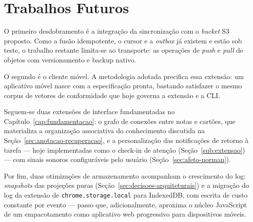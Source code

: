 \documentclass[12pt, %
openright, 
oneside,
a4paper,
english,   %
brazil]{facom-ufu-abntex2}
\begin{document}
\section{Trabalhos Futuros}

O primeiro desdobramento é a integração da sincronização com o
\textit{bucket} S3 proposto. Como a fusão idempotente, o cursor e a
\textit{outbox} já existem e estão sob teste, o trabalho restante
limita-se ao transporte: as operações de \textit{push} e \textit{pull}
de objetos com versionamento e backup nativo.

O segundo é o cliente móvel. A metodologia adotada precifica essa extensão:
um aplicativo móvel nasce com a especificação pronta, bastando satisfazer o
mesmo corpus de vetores de conformidade que hoje governa a extensão e a CLI.

Seguem-se duas extensões de interface fundamentadas no
Capítulo~\ref{cap:fundamentacao}: o grafo de conexões entre notas e cartões,
que materializa a organização associativa do conhecimento discutida na
Seção~\ref{sec:anotacao-recuperacao}, e a personalização das notificações de
retorno à tarefa --- hoje implementadas como o check-in de atenção
(Seção~\ref{sub:extensao}) --- com sinais sonoros configuráveis pelo usuário
(Seção~\ref{sec:afeto-norman}).

Por fim, duas otimizações de armazenamento acompanham o crescimento do log:
\textit{snapshots} das projeções puras
(Seção~\ref{sec:decisoes-arquiteturais}) e a migração do log da extensão de
\texttt{chrome.storage.local} para IndexedDB, com escrita de custo constante
por evento --- passo que, adicionalmente, aproxima o núcleo JavaScript de um
empacotamento como aplicativo web progressivo para dispositivos móveis.

\postextual





\printindex
\end{document}
